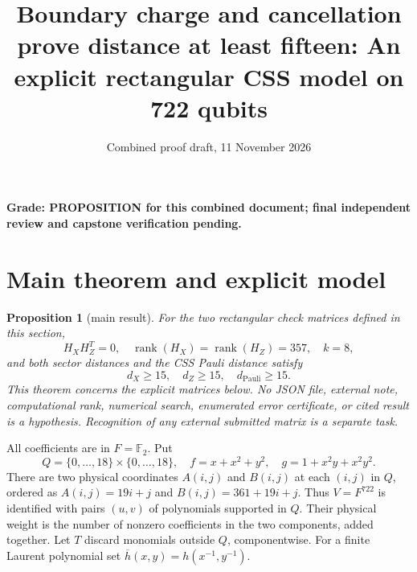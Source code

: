 \documentclass{article}
\title{Boundary charge and cancellation prove distance at least fifteen: An explicit rectangular CSS model on 722 qubits}
\author{}
\date{Combined proof draft, 11 November 2026}
\newtheorem{proposition}{Proposition}
\DeclareMathOperator{\rank}{rank}
\newcommand{\Ftwo}{\mathbb{F}_2}
\begin{document}
\maketitle

\textbf{Grade: PROPOSITION for this combined document; final independent review and
  capstone verification pending.}

\section{Main theorem and explicit model}\label{sec:model}

\begin{proposition}[main result]\label{prop:main}
  For the two rectangular check matrices defined in this section,
  \begin{equation}
    H_X H_Z^T=0, \quad
    \rank(H_X)=\rank(H_Z)=357, \quad k=8,
  \end{equation}
  and both sector distances and the CSS Pauli distance satisfy
  \begin{equation}
    d_X\ge 15, \quad d_Z\ge 15, \quad d_{\text{Pauli}}\ge 15.
  \end{equation}
  This theorem concerns the explicit matrices below. No JSON file,
  external note, computational rank, numerical search, enumerated error
  certificate, or cited result is a hypothesis. Recognition of any external
  submitted matrix is a separate task.
\end{proposition}

All coefficients are in \(F=\Ftwo\). Put
\begin{equation}
  Q=\{0,\dots,18\}\times\{0,\dots,18\}, \quad
  f=x+x^2+y^2, \quad g=1+x^2y+x^2y^2.
\end{equation}
There are two physical coordinates \(A(i,j)\) and \(B(i,j)\) at each \((i,j)\)
in \(Q\), ordered as \(A(i,j)=19i+j\) and \(B(i,j)=361+19i+j\).
Thus \(V=F^{722}\) is identified with pairs \((u,v)\) of polynomials supported
in \(Q\). Their physical weight is the number of nonzero coefficients in
the two components, added together. Let \(T\) discard monomials outside
\(Q\), componentwise. For a finite Laurent polynomial set
\(\overline{h}(x,y)=h(x^{-1},y^{-1})\).
\end{document}
